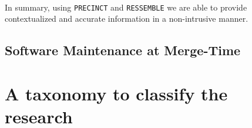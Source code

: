 


\\

In summary, using {\tt PRECINCT} and {\tt RESSEMBLE} we are able to provide contextualized and accurate information in a non-intrusive manner.

\section{Software Maintenance at Merge-Time}



\chapter{A taxonomy to classify the research\label{chap:taxonomy}}


